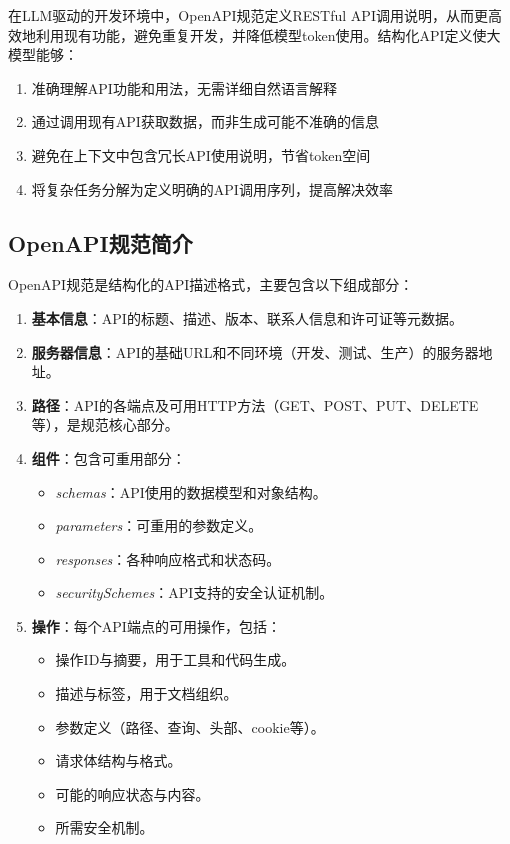 在LLM驱动的开发环境中，OpenAPI规范定义RESTful API调用说明，从而更高效地利用现有功能，避免重复开发，并降低模型token使用。结构化API定义使大模型能够：
\begin{enumerate}
  \item 准确理解API功能和用法，无需详细自然语言解释
  \item 通过调用现有API获取数据，而非生成可能不准确的信息
  \item 避免在上下文中包含冗长API使用说明，节省token空间
  \item 将复杂任务分解为定义明确的API调用序列，提高解决效率
\end{enumerate}

\subsection{OpenAPI规范简介}
OpenAPI规范是结构化的API描述格式，主要包含以下组成部分\cite{openapi2023spec}：

\begin{enumerate}
  \item \textbf{基本信息}：API的标题、描述、版本、联系人信息和许可证等元数据。
  
  \item \textbf{服务器信息}：API的基础URL和不同环境（开发、测试、生产）的服务器地址。
  
  \item \textbf{路径}：API的各端点及可用HTTP方法（GET、POST、PUT、DELETE等），是规范核心部分。
  
  \item \textbf{组件}：包含可重用部分：
    \begin{itemize}
      \item \textit{schemas}：API使用的数据模型和对象结构。
      \item \textit{parameters}：可重用的参数定义。
      \item \textit{responses}：各种响应格式和状态码。
      \item \textit{securitySchemes}：API支持的安全认证机制。
    \end{itemize}
  
  \item \textbf{操作}：每个API端点的可用操作，包括：
    \begin{itemize}
      \item 操作ID与摘要，用于工具和代码生成。
      \item 描述与标签，用于文档组织。
      \item 参数定义（路径、查询、头部、cookie等）。
      \item 请求体结构与格式。
      \item 可能的响应状态与内容。
      \item 所需安全机制。
    \end{itemize}
\end{enumerate}

